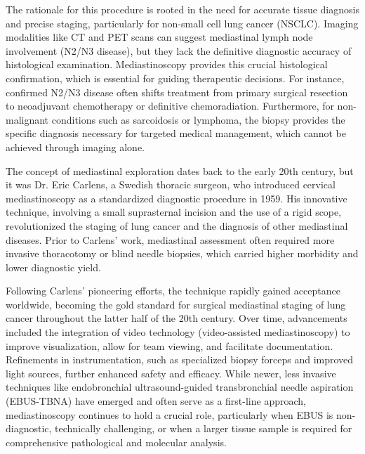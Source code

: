 The rationale for this procedure is rooted in the need for accurate tissue diagnosis and precise staging, particularly for non-small cell lung cancer (NSCLC). Imaging modalities like CT and PET scans can suggest mediastinal lymph node involvement (N2/N3 disease), but they lack the definitive diagnostic accuracy of histological examination. Mediastinoscopy provides this crucial histological confirmation, which is essential for guiding therapeutic decisions. For instance, confirmed N2/N3 disease often shifts treatment from primary surgical resection to neoadjuvant chemotherapy or definitive chemoradiation. Furthermore, for non-malignant conditions such as sarcoidosis or lymphoma, the biopsy provides the specific diagnosis necessary for targeted medical management, which cannot be achieved through imaging alone.

The concept of mediastinal exploration dates back to the early 20th century, but it was Dr. Eric Carlens, a Swedish thoracic surgeon, who introduced cervical mediastinoscopy as a standardized diagnostic procedure in 1959. His innovative technique, involving a small suprasternal incision and the use of a rigid scope, revolutionized the staging of lung cancer and the diagnosis of other mediastinal diseases. Prior to Carlens' work, mediastinal assessment often required more invasive thoracotomy or blind needle biopsies, which carried higher morbidity and lower diagnostic yield.

Following Carlens' pioneering efforts, the technique rapidly gained acceptance worldwide, becoming the gold standard for surgical mediastinal staging of lung cancer throughout the latter half of the 20th century. Over time, advancements included the integration of video technology (video-assisted mediastinoscopy) to improve visualization, allow for team viewing, and facilitate documentation. Refinements in instrumentation, such as specialized biopsy forceps and improved light sources, further enhanced safety and efficacy. While newer, less invasive techniques like endobronchial ultrasound-guided transbronchial needle aspiration (EBUS-TBNA) have emerged and often serve as a first-line approach, mediastinoscopy continues to hold a crucial role, particularly when EBUS is non-diagnostic, technically challenging, or when a larger tissue sample is required for comprehensive pathological and molecular analysis.

